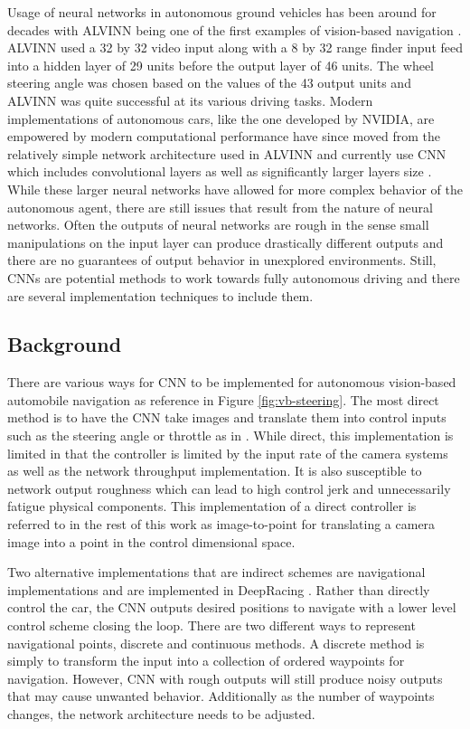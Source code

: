 \documentclass[conference]{IEEEtran}
\begin{document}
Usage of neural networks in autonomous ground vehicles has been around for decades with ALVINN being one of the first examples of vision-based navigation \cite{pomerieau-1989}. ALVINN used a 32 by 32 video input along with a 8 by 32 range finder input feed into a hidden layer of 29 units before the output layer of 46 units. The wheel steering angle was chosen based on the values of the 43 output units and ALVINN was quite successful at its various driving tasks. Modern implementations of autonomous cars, like the one developed by NVIDIA, are empowered by modern computational performance have since moved from the relatively simple network architecture used in ALVINN and currently use CNN which includes convolutional layers as well as significantly larger layers size \cite{bojarski2016end}. While these larger neural networks have allowed for more complex behavior of the autonomous agent, there are still issues that result from the nature of neural networks. Often the outputs of neural networks are rough in the sense  small manipulations on the input layer can produce drastically different outputs and there are no guarantees of output behavior in unexplored environments. Still, CNNs are potential methods to work towards fully autonomous driving and there are several implementation techniques to include them.

\subsection{Background}

There are various ways for CNN to be implemented for autonomous vision-based automobile navigation as reference in Figure \ref{fig:vb-steering}. The most direct method is to have the CNN take images and translate them into control inputs such as the steering angle or throttle as in \cite{bechtel2018}. While direct, this implementation is limited in that the controller is limited by the input rate of the camera systems as well as the network throughput implementation. It is also susceptible to network output roughness which can lead to high control jerk and unnecessarily fatigue physical components. This implementation of a direct controller is referred to in the rest of this work as image-to-point for translating a camera image into a point in the control dimensional space.

Two alternative implementations that are indirect schemes are navigational implementations and are implemented in DeepRacing \cite{trent2020iros}. Rather than directly control the car, the CNN outputs desired positions to navigate with a lower level control scheme closing the loop. There are two different ways to represent navigational points, discrete and continuous methods. A discrete method is simply to transform the input into a collection of ordered waypoints for navigation. However, CNN with rough outputs will still produce noisy outputs that may cause unwanted behavior. Additionally as the number of waypoints changes, the network architecture needs to be adjusted.
\end{document}
